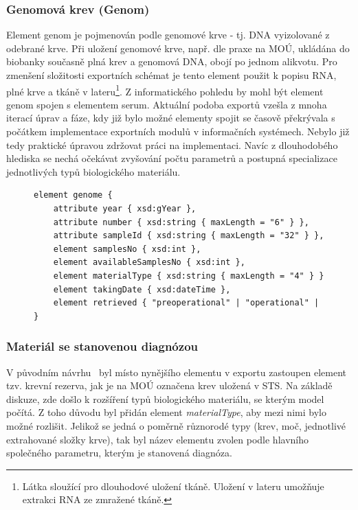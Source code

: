 \subsubsection{Genomová krev (Genom)}
Element genom je pojmenován podle genomové krve - tj. DNA vyizolované z odebrané krve. Při uložení genomové krve, např. dle praxe na MOÚ, ukládána do biobanky současně plná krev a genomová DNA, obojí po jednom alikvotu.
Pro zmenšení složitosti exportních schémat je tento element použit k popisu RNA, plné krve a tkáně v lateru\footnote{Látka sloužící pro dlouhodové uložení tkáně. Uložení v lateru umožňuje extrakci RNA ze zmražené tkáně.}.
Z informatického pohledu by mohl být element genom spojen s elementem serum. Aktuální podoba exportů vzešla z mnoha iterací úprav a fáze, kdy již bylo možné elementy spojit se časově překrývala s počátkem implementace exportních modulů v informačních systémech. Nebylo již tedy praktické úpravou zdržovat práci na implementaci. Navíc z dlouhodobého hlediska se nechá očekávat zvyšování počtu parametrů a postupná specializace jednotlivých typů biologického materiálu.
\begin{figure}[h!]
\begin{center}
\begin{lstlisting}[language=XML, caption={Element popisující sérum v~exportním schéma.},
label={fig:export:data:genome}]
element genome {
	attribute year { xsd:gYear },
	attribute number { xsd:string { maxLength = "6" } },
	attribute sampleId { xsd:string { maxLength = "32" } },
	element samplesNo { xsd:int },
	element availableSamplesNo { xsd:int },
	element materialType { xsd:string { maxLength = "4" } }
	element takingDate { xsd:dateTime },
	element retrieved { "preoperational" | "operational" | "post" | "unknown" }
}
\end{lstlisting}
\end{center}
\end{figure}
\subsubsection{Materiál se stanovenou diagnózou}
V původním návrhu~\cite{ARCH_2011_12_29} byl místo nynějšího elementu v exportu zastoupen element tzv. krevní rezerva, jak je na MOÚ označena krev uložená v STS. Na základě diskuze, zde došlo k rozšíření typů biologického materiálu, se kterým model počítá. Z toho důvodu byl přidán element \textit{materialType}, aby mezi nimi bylo možné rozlišit. 
Jelikož se jedná o poměrně různorodé typy (krev, moč, jednotlivé extrahované složky krve), tak byl název elementu zvolen podle hlavního společného parametru, kterým je stanovená diagnóza.

